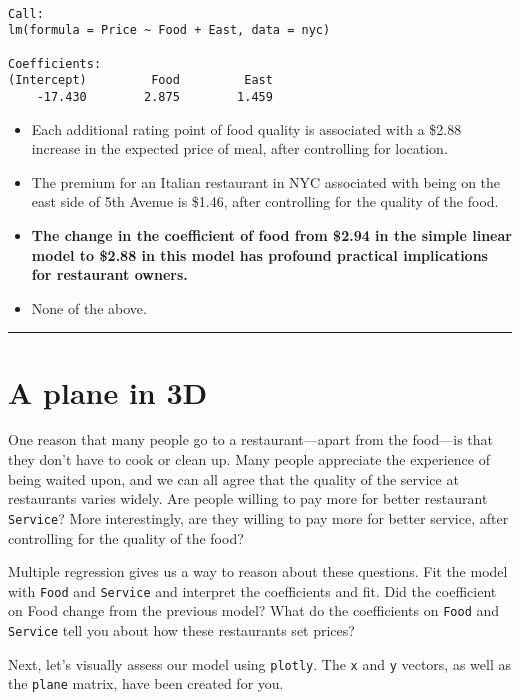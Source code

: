 \documentclass[
]{book}
\begin{document}
\begin{verbatim}

Call:
lm(formula = Price ~ Food + East, data = nyc)

Coefficients:
(Intercept)         Food         East  
    -17.430        2.875        1.459  
\end{verbatim}

\begin{itemize}
\item
  Each additional rating point of food quality is associated with a \$2.88 increase in the expected price of meal, after controlling for location.
\item
  The premium for an Italian restaurant in NYC associated with being on the east side of 5th Avenue is \$1.46, after controlling for the quality of the food.
\item
  \textbf{The change in the coefficient of food from \$2.94 in the simple linear model to \$2.88 in this model has profound practical implications for restaurant owners.}
\item
  None of the above.
\end{itemize}

\begin{center}\rule{0.5\linewidth}{0.5pt}\end{center}

\hypertarget{a-plane-in-3d}{%
\section{A plane in 3D}\label{a-plane-in-3d}}

One reason that many people go to a restaurant---apart from the food---is that they don't have to cook or clean up. Many people appreciate the experience of being waited upon, and we can all agree that the quality of the service at restaurants varies widely. Are people willing to pay more for better restaurant \texttt{Service}? More interestingly, are they willing to pay more for better service, after controlling for the quality of the food?

Multiple regression gives us a way to reason about these questions. Fit the model with \texttt{Food} and \texttt{Service} and interpret the coefficients and fit. Did the coefficient on Food change from the previous model? What do the coefficients on \texttt{Food} and \texttt{Service} tell you about how these restaurants set prices?

Next, let's visually assess our model using \texttt{plotly}. The \texttt{x} and \texttt{y} vectors, as well as the \texttt{plane} matrix, have been created for you.
\end{document}
